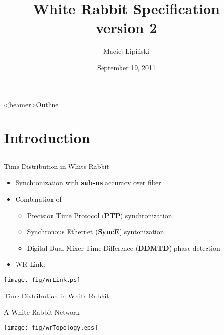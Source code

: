 \documentclass[compress,red]{beamer}
\title[White Rabbit Specification\hspace{2em}\insertframenumber/ \inserttotalframenumber]
{White Rabbit Specification \\ version 2}
\institute{
$5^{th}$ White Rabbit Workshop \\ CERN
}
\author{
Maciej Lipi\'{n}ski %
}
\date{September 19, 2011}
\begin{document}
\frame{\titlepage}
\begin{frame}<beamer>{Outline}

    \tableofcontents %

\end{frame}
\section{Introduction}
\subsection{}
\begin{frame}{Time Distribution in White Rabbit}

  \begin{itemize}
    \item Synchronization with {\bf sub-ns} accuracy over fiber
    \item Combination of
	\begin{itemize}
	  \item Precision Time Protocol ({\bf PTP}) synchronization
	  \item Synchronous Ethernet ({\bf SyncE}) syntonization
	  \item Digital Dual-Mixer Time Difference ({\bf DDMTD}) phase detection
	\end{itemize}
    \item WR Link:
  \end{itemize}

  \begin{center}
  \texttt{[image: fig/wrLink.ps]}
  \end{center}

\end{frame}
\begin{frame}{Time Distribution in White Rabbit}

\center A White Rabbit Network
  \begin{center}
  \texttt{[image: fig/wrTopology.eps]}
  \end{center}
\end{frame}
\end{document}
